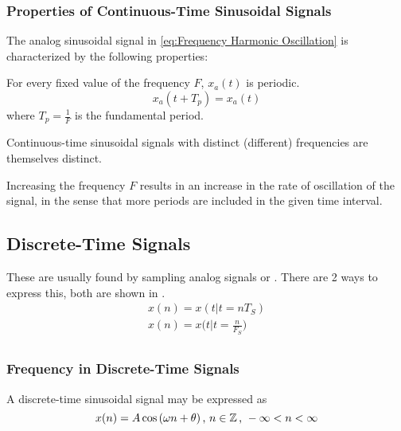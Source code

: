 \subsubsection{Properties of Continuous-Time Sinusoidal Signals}\label{subsubsec:Properties Continuous-Time Sinusoids}
The analog sinusoidal signal in \cref{eq:Frequency Harmonic Oscillation} is characterized by the following properties:
\begin{propertylist}
\item For every fixed value of the frequency $F$, $x_{a}(t)$ is periodic.
  \begin{equation*}
    x_{a}(t+T_{p}) = x_{a}(t)
  \end{equation*}
  where $T_{p} = \frac{1}{F}$ is the fundamental period.
\item Continuous-time sinusoidal signals with distinct (different) frequencies are themselves distinct.
\item Increasing the frequency $F$ results in an increase in the rate of oscillation of the signal, in the sense that more periods are included in the given time interval.
\end{propertylist}

\subsection{Discrete-Time Signals}\label{subsec:Discrete-Time Signals}
These are usually found by sampling analog signals or .
There are 2 ways to express this, both are shown in .
\begin{equation}\label{eq:A_D_By_Sampling}
  \begin{aligned}
    x(n) = x(t \vert t = nT_{S}) \\
    x(n) = x \Biggl( t \vert t = \frac{n}{F_{S}} \Biggr) \\
  \end{aligned}
\end{equation}

\subsubsection{Frequency in Discrete-Time Signals}\label{subsubsec:Frequency in Discrete-Time Signals}
A discrete-time sinusoidal signal may be expressed as
\begin{equation}\label{eq:Discrete Time Sinusoid}
  x(n) = A \cos \left( \omega n + \theta \right) \text{, } n \in \operatorname{\mathbb{Z}} \text{, } -\infty < n < \infty
\end{equation}

